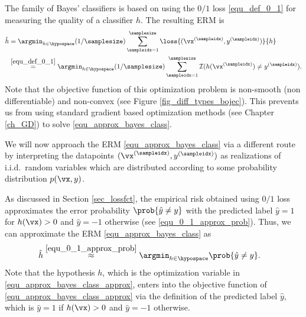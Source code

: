 \documentclass[12pt]{report}
\begin{document}
 The family of Bayes' classifiers is based on using the $0/1$ loss \eqref{equ_def_0_1} for 
 measuring the quality of a classifier $h$. The resulting ERM is 
\begin{align}
\label{equ_approx_bayes_class}
\hat{h} & = \argmin_{h \in \hypospace} (1/\samplesize) \sum_{\sampleidx=1}^{\samplesize} \loss{(\vx^{(\sampleidx)},y^{(\sampleidx)})}{h}   \nonumber \\ 
                      & \stackrel{\eqref{equ_def_0_1}}{=}  \argmin_{h \in \hypospace} (1/\samplesize) \sum_{\sampleidx=1}^{\samplesize} \mathcal{I} ( h(\vx^{(\sampleidx)}) \neq y^{(\sampleidx)}). %
\end{align}
Note that the objective function of this optimization problem is non-smooth 
(non differentiable) and non-convex (see Figure \ref{fig_diff_types_bojec}). 
This prevents us from using standard gradient based optimization methods 
(see Chapter \ref{ch_GD}) to solve \eqref{equ_approx_bayes_class}.

We will now approach the ERM \eqref{equ_approx_bayes_class} via a different 
route by interpreting the datapoints $(\vx^{(\sampleidx)},y^{(\sampleidx)})$ as 
realizations of i.i.d.\ random variables which are distributed according to some 
probability distribution $p(\vx,y)$. 

As discussed in Section \ref{sec_lossfct}, the empirical risk obtained using $0/1$ 
loss approximates the error probability $\prob { \hat{y} \neq y }$ with the predicted 
label $\hat{y} = 1$ for $h(\vx) > 0$ and $\hat{y} = -1$ otherwise (see \eqref{equ_0_1_approx_prob}). 
Thus, we can approximate the ERM \eqref{equ_approx_bayes_class} as 
\begin{align}
\label{equ_approx_bayes_class_approx}
\hat{h}    & \stackrel{\eqref{equ_0_1_approx_prob}}{\approx}\argmin_{h \in \hypospace} \prob{ \hat{y} \neq y} . 
\end{align}
Note that the hypothesis $h$, which is the optimization variable 
in \eqref{equ_approx_bayes_class_approx}, enters into the objective 
function of \eqref{equ_approx_bayes_class_approx} via the definition 
of the predicted label $\hat{y}$, which is $\hat{y} = 1 $ if $h(\vx) > 0$ 
and $\hat{y} =-1$ otherwise. 
\end{document}
